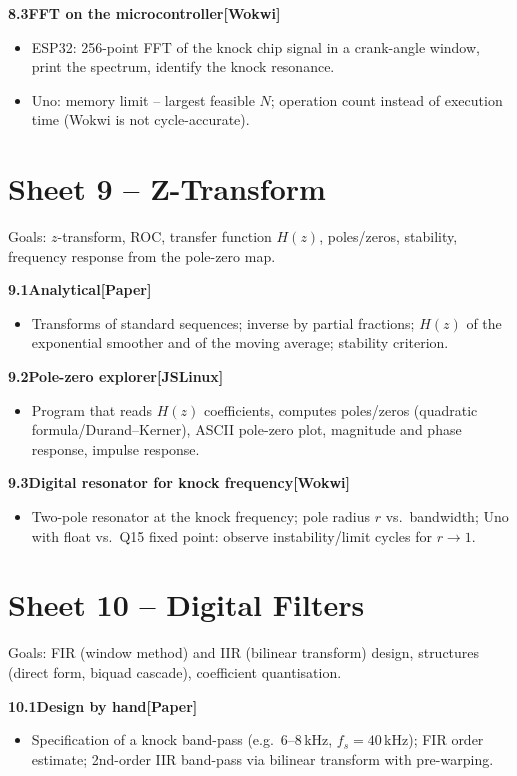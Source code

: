 \documentclass[11pt,a4paper]{article}
\newcommand{\W}{\textsf{\textbf{[Wokwi]}}}
\newcommand{\J}{\textsf{\textbf{[JSLinux]}}}
\newcommand{\Pap}{\textsf{\textbf{[Paper]}}}
\newcommand{\exercise}[4]{%
  \par\smallskip\noindent\textbf{#1\quad #2}\hfill#3\par
  \nopagebreak\begin{itemize}[leftmargin=1.2em]#4\end{itemize}}
\begin{document}
\exercise{8.3}{FFT on the microcontroller}{\W}{
  \item ESP32: 256-point FFT of the knock chip signal in a crank-angle
    window, print the spectrum, identify the knock resonance.
  \item Uno: memory limit -- largest feasible $N$; operation count instead
    of execution time (Wokwi is not cycle-accurate).}

\section{Sheet 9 -- Z-Transform}
\begin{sheetinfo}
Goals: $z$-transform, ROC, transfer function $H(z)$, poles/zeros,
stability, frequency response from the pole-zero map.
\end{sheetinfo}

\exercise{9.1}{Analytical}{\Pap}{
  \item Transforms of standard sequences; inverse by partial fractions;
    $H(z)$ of the exponential smoother and of the moving average;
    stability criterion.}

\exercise{9.2}{Pole-zero explorer}{\J}{
  \item Program that reads $H(z)$ coefficients, computes poles/zeros
    (quadratic formula/Durand--Kerner), ASCII pole-zero plot, magnitude
    and phase response, impulse response.}

\exercise{9.3}{Digital resonator for knock frequency}{\W}{
  \item Two-pole resonator at the knock frequency; pole radius $r$
    vs.\ bandwidth; Uno with float vs.\ Q15 fixed point: observe
    instability/limit cycles for $r\to1$.}

\section{Sheet 10 -- Digital Filters}
\begin{sheetinfo}
Goals: FIR (window method) and IIR (bilinear transform) design,
structures (direct form, biquad cascade), coefficient quantisation.
\end{sheetinfo}

\exercise{10.1}{Design by hand}{\Pap}{
  \item Specification of a knock band-pass (e.g.\ 6--8\,kHz, $f_s=40$\,kHz);
    FIR order estimate; 2nd-order IIR band-pass via bilinear transform
    with pre-warping.}
\end{document}
